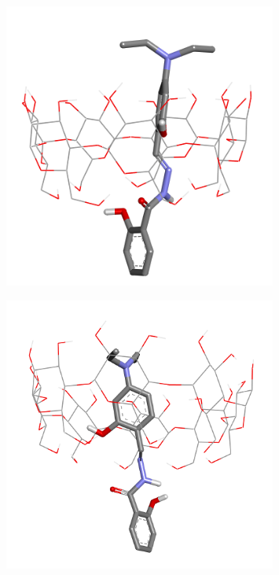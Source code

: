 \begin{figure}[H]
	\centering
	\includegraphics[width=0.8\textwidth]{media/chem2/image56}
	\caption*{}
\end{figure}

\begin{figure}[H]
	\centering
	\includegraphics[width=0.8\textwidth]{media/chem2/image57}
	\caption*{}
\end{figure}

